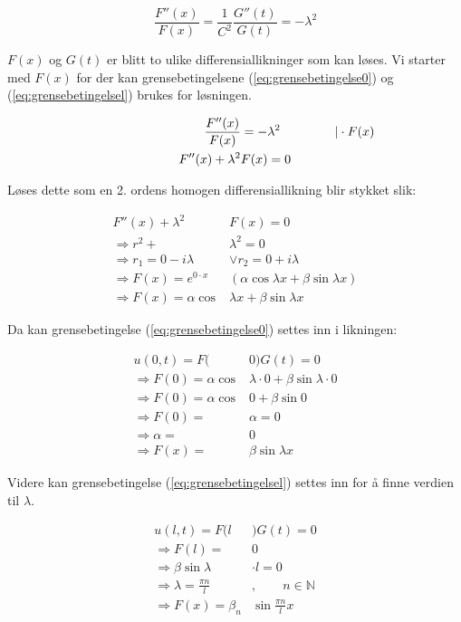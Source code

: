 \begin{equation*}
	\frac{F''(x)}{F(x)} = \frac{1}{C^2} \frac{G''(t)}{G(t)} = - \lambda^2
\end{equation*}

$F(x)$ og $G(t)$ er blitt to ulike differensiallikninger som kan løses. Vi starter med $F(x)$ for der
kan grensebetingelsene (\ref{eq:grensebetingelse0}) og (\ref{eq:grensebetingelsel}) brukes for 
løsningen.

\begin{align*}
	\hspace{20ex} \frac{F''(x)}{F(x)} &= - \lambda^2 \hspace{10ex} \vert \cdot F(x)\\
	F''(x) + \lambda^2&F(x) = 0
\end{align*}

Løses dette som en 2. ordens homogen differensiallikning blir stykket slik:

\begin{align*}
	F''(x) + \lambda^2&F(x) = 0 \\ 
	\Rightarrow r^2 + &\lambda^2 = 0 \\
	\Rightarrow r_1 = 0 - i \lambda &\vee r_2 = 0 + i \lambda \\
	\Rightarrow F(x) = e^{0 \cdot x} & \left( \alpha  \cos \lambda x + \beta \sin \lambda x \right) \\
	\Rightarrow F(x) = \alpha \cos& \lambda x + \beta \sin \lambda x 
\end{align*}

Da kan grensebetingelse (\ref{eq:grensebetingelse0}) settes inn i likningen:

\begin{align*}
	u(0 , t) = F(&0)G(t) = 0\\
	\Rightarrow F(0) = \alpha \cos&\lambda \cdot 0 + \beta \sin \lambda \cdot 0 \\
	\Rightarrow F(0) = \alpha \cos&0 + \beta \sin 0 \\
	\Rightarrow F(0) = &\alpha = 0 \\
	\Rightarrow \alpha =& 0 \\
	\Rightarrow F(x) = &\beta \sin \lambda x
\end{align*}

Videre kan grensebetingelse (\ref{eq:grensebetingelsel}) settes inn for å finne verdien til $\lambda$.

\begin{align*}
	u(l ,t) = F(l&)G(t) = 0 \\
	\Rightarrow F(l) =& 0 \\
	\Rightarrow \beta \sin \lambda &\cdot l = 0 \\ 
	\Rightarrow \lambda = \frac{\pi n}{l}&, \qquad n \in \mathbb{N} \\
	\Rightarrow F(x) = { \beta }_n & \sin \frac{\pi n}{l} x
\end{align*}

